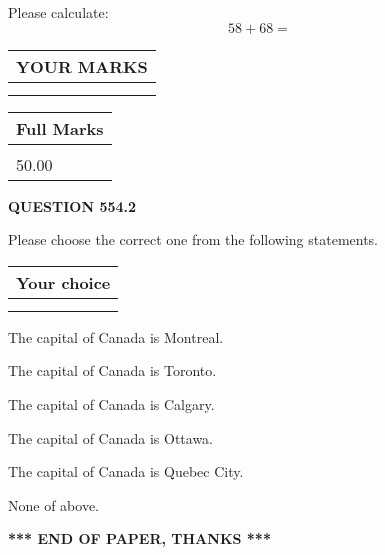 \documentclass[12pt]{article}
\begin{document}
  
 
Please calculate:
\begin{equation}
58 +  %
68 = \nonumber
\end{equation}
 

 

 
  
\vspace{0.2in}
  
\noindent\begin{tabular}{|l|}
\hline
 YOUR MARKS  \\
\hline
 \\ 
 \\ 
\hline
\end{tabular}
\hspace{0.05in} \begin{tabular}{|l|}
\hline
 Full Marks  \\
\hline
 \\ 
50.00 \\
\hline
\end{tabular}
{\textbf{\Large{QUESTION
554.2 
}}}
  
  
Please choose the correct one from the following statements.
  
  
\noindent\hspace{3.0in} \begin{tabular}{|l|}
\hline
Your choice \\
\hline
 \\ 
 \\ 
\hline
\end{tabular}
  
  
 
 
The capital of Canada is Montreal.
 
 
The capital of Canada is Toronto.
 
 
The capital of Canada is Calgary.
 
 
The capital of Canada is Ottawa.
 
 
The capital of Canada is Quebec City.
 
 
 None of above.
 
 
   
   
 \vspace{0.2in}
 
   
   
   
   
\vspace{1.0in} 
{\textbf{\large{ *** END OF PAPER, THANKS *** }}} 
   
\end{document}
